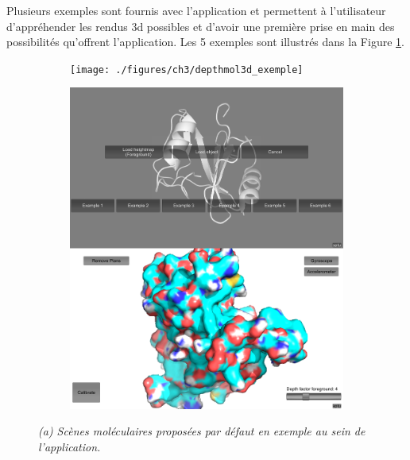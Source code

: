 Plusieurs exemples sont fournis avec l'application et permettent à l'utilisateur d'appréhender les rendus 3d possibles et d'avoir une première prise en main des possibilités qu'offrent l'application. Les 5 exemples sont illustrés dans la Figure \ref{Fig:depthmol3d_exemple}.


\begin{figure}[h]
\begin{subfigure}{.5\textwidth}
  \centering
  {\texttt{[image: ./figures/ch3/depthmol3d\_exemple]}}
    \caption{}
  \label{Fig:depthmol3d_exemple}
\end{subfigure}
\begin{subfigure}{.5\textwidth}
  \centering
  {\includegraphics[width=.75\linewidth]{./figures/ch3/depthmol3d_screenshots}}
    \caption{}
  \label{Fig:depthmol3d_screenshots}
\end{subfigure}
\caption{{\it (a) Scènes moléculaires proposées par défaut en exemple au sein de l'application.
}}
\end{figure}
